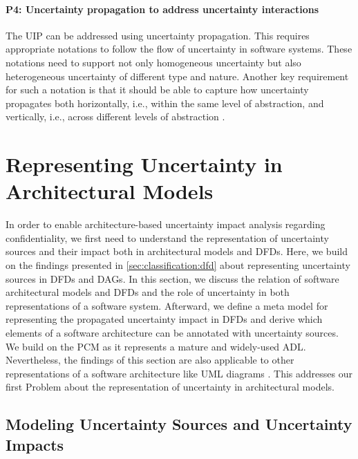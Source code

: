 \paragraph{P4: Uncertainty propagation to address uncertainty interactions}\label{p:2:4}
The \acf{UIP} can be addressed using uncertainty propagation.
This requires appropriate notations to follow the flow of uncertainty in software systems.
These notations need to support not only homogeneous uncertainty but also heterogeneous uncertainty of different type and nature.
Another key requirement for such a notation is that it should be able to capture how uncertainty propagates both horizontally, i.e., within the same level of abstraction, and vertically, i.e., across different levels of abstraction \cite{camara_addressing_2022}.




\section{Representing Uncertainty in Architectural Models}%
\label{sec:impactanalysis:representing}

In order to enable architecture-based uncertainty impact analysis regarding confidentiality, we first need to understand the representation of uncertainty sources and their impact both in architectural models and \acp{DFD}.
Here, we build on the findings presented in \autoref{sec:classification:dfd} about representing uncertainty sources in \acp{DFD} and \acfp{DAG}.
In this section, we discuss the relation of software architectural models and \acp{DFD} and the role of uncertainty in both representations of a software system.
Afterward, we define a meta model for representing the propagated uncertainty impact in \acp{DFD} and derive which elements of a software architecture can be annotated with uncertainty sources.
We build on the \ac{PCM} as it represents a mature and widely-used \ac{ADL}.
Nevertheless, the findings of this section are also applicable to other representations of a software architecture like \acf{UML} diagrams \cite{object_management_group_unified_2015}.
This addresses our first Problem  about the representation of uncertainty in architectural models.


\subsection{Modeling Uncertainty Sources and Uncertainty Impacts}

